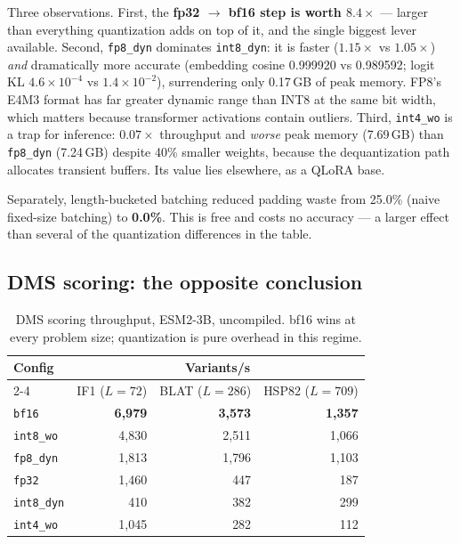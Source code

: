 \documentclass[11pt]{article}
\newcommand{\cfg}[1]{\texttt{#1}}
\newcommand{\best}[1]{\textbf{#1}}
\begin{document}
Three observations. First, the \textbf{fp32 $\to$ bf16 step is worth
$8.4\times$} --- larger than everything quantization adds on top of it, and the
single biggest lever available. Second, \cfg{fp8\_dyn} dominates
\cfg{int8\_dyn}: it is faster ($1.15\times$ vs $1.05\times$) \emph{and}
dramatically more accurate (embedding cosine 0.999920 vs 0.989592; logit KL
$4.6\times10^{-4}$ vs $1.4\times10^{-2}$), surrendering only 0.17\,GB of peak
memory. FP8's E4M3 format has far greater dynamic range than INT8 at the same
bit width, which matters because transformer activations contain outliers.
Third, \cfg{int4\_wo} is a trap for inference: $0.07\times$ throughput and
\emph{worse} peak memory (7.69\,GB) than \cfg{fp8\_dyn} (7.24\,GB) despite 40\%
smaller weights, because the dequantization path allocates transient buffers.
Its value lies elsewhere, as a QLoRA base.

Separately, length-bucketed batching reduced padding waste from 25.0\% (naive
fixed-size batching) to \textbf{0.0\%}. This is free and costs no accuracy ---
a larger effect than several of the quantization differences in the table.

\subsection{DMS scoring: the opposite conclusion}

\begin{table}[htb]
\centering
\caption{DMS scoring throughput, ESM2-3B, uncompiled. bf16 wins at every problem
size; quantization is pure overhead in this regime.}
\small
\begin{tabular}{lrrr}
\toprule
Config & \multicolumn{3}{c}{Variants/s} \\
\cmidrule(lr){2-4}
       & IF1 ($L{=}72$) & BLAT ($L{=}286$) & HSP82 ($L{=}709$) \\
\midrule
\cfg{bf16}      & \best{6{,}979} & \best{3{,}573} & \best{1{,}357} \\
\cfg{int8\_wo}  & 4{,}830 & 2{,}511 & 1{,}066 \\
\cfg{fp8\_dyn}  & 1{,}813 & 1{,}796 & 1{,}103 \\
\cfg{fp32}      & 1{,}460 &   447 &   187 \\
\cfg{int8\_dyn} &   410 &   382 &   299 \\
\cfg{int4\_wo}  & 1{,}045 &   282 &   112 \\
\bottomrule
\end{tabular}
\end{table}
\end{document}
